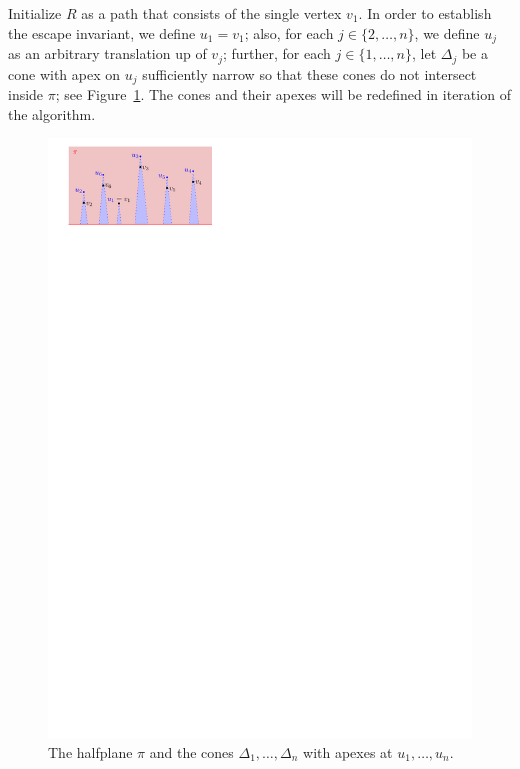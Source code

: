 \documentclass[11pt]{patmorin}
\begin{document}
Initialize $R$ as a path that consists of the single vertex $v_1$. In order to establish the escape invariant, we define $u_1=v_1$; also, for each $j\in \{2,\dots,n\}$, we define $u_j$ as an arbitrary translation up of $v_j$; further, for each $j\in \{1,\dots,n\}$, let $\Delta_j$ be a cone with apex on $u_j$ sufficiently narrow so that these cones do not intersect inside $\pi$; see Figure~\ref{fig:Escape Invariant}.
The cones and their apexes will be redefined in iteration of the algorithm.

\begin{figure}[tb]
\centering 
\includegraphics{img/EscapeInvariant.pdf}
\caption{The halfplane $\pi$ and the cones $\Delta_1,\ldots,\Delta_n$ with apexes at $u_1,\ldots,u_n$.}
\label{fig:Escape Invariant}
\end{figure}

\end{document}
